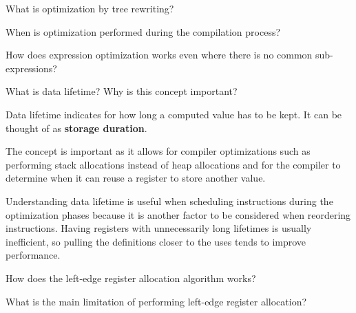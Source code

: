 \begin{Exercise}
What is optimization by tree rewriting?
\end{Exercise}

\begin{Exercise}
When is optimization performed during the compilation process?
\end{Exercise}

\begin{Exercise}
How does expression optimization works even where there is no common sub-expressions?
\end{Exercise}

\begin{Exercise}[difficulty=1]
What is data lifetime? Why is this concept important?
\end{Exercise}
\begin{Answer}
Data lifetime indicates for how long a computed value has to be kept.
It can be thought of as \textbf{storage duration}.

The concept is important as it allows for compiler optimizations such as performing stack allocations instead of heap allocations and for the compiler to determine when it can reuse a register to store another value.

Understanding data lifetime is useful when scheduling instructions during the optimization phases because it is another factor to be considered when reordering instructions.
Having registers with unnecessarily long lifetimes is usually inefficient, so pulling the definitions closer to the uses tends to improve performance.
\end{Answer}

\begin{Exercise}
How does the left-edge register allocation algorithm works?
\end{Exercise}

\begin{Exercise}
What is the main limitation of performing left-edge register allocation?
\end{Exercise}
